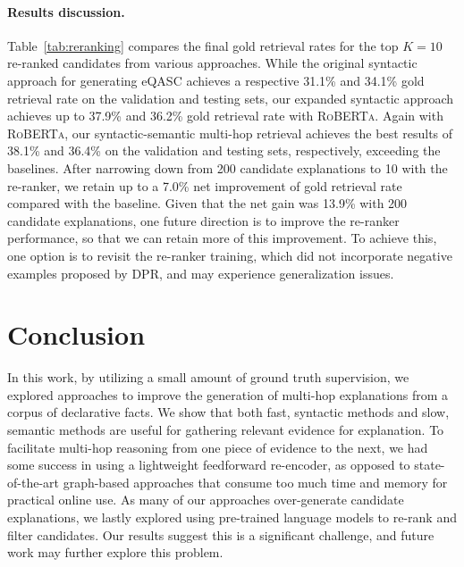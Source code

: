 \documentclass[letterpaper]{article} %
\begin{document}

\paragraph{Results discussion.}
Table~\ref{tab:reranking} compares the final gold retrieval rates for the top $K=10$ re-ranked candidates from various approaches. While the original syntactic approach for generating eQASC achieves a respective 31.1\% and 34.1\% 
gold retrieval rate on the validation and testing sets, our expanded syntactic approach achieves up to 37.9\% and 36.2\% gold retrieval rate with \textsc{RoBERTa}. Again with \textsc{RoBERTa}, our syntactic-semantic multi-hop retrieval achieves the best results of 38.1\% and 36.4\% on the validation and testing sets, respectively, exceeding the baselines. 
After narrowing down from 200 candidate explanations to 10 with the re-ranker, we retain up to a 7.0\% net improvement of gold retrieval rate compared with the baseline. Given that the net gain was 13.9\% with 200 candidate explanations, one future direction is to improve the re-ranker performance, so that we can retain more of this improvement.
To achieve this, one option is to revisit the re-ranker training, which did not incorporate negative examples proposed by DPR, and may experience generalization issues.




\section{Conclusion}
In this work, by utilizing a small amount of ground truth supervision, we explored approaches to improve the generation of multi-hop explanations from a corpus of declarative facts. We show that both fast, syntactic methods and slow, semantic methods are useful for gathering relevant evidence for explanation. 
To facilitate multi-hop reasoning from one piece of evidence to the next, we had some success in using a lightweight feedforward re-encoder, as opposed to state-of-the-art graph-based approaches that consume too much time and memory for practical online use.
As many of our approaches over-generate candidate explanations, we lastly explored using pre-trained language models to re-rank and filter candidates. Our results suggest this is a significant challenge, and future work may further explore this problem.



\end{document}
